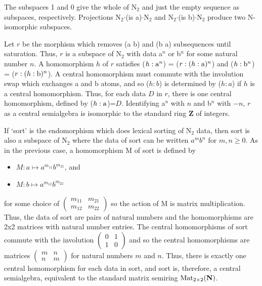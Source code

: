 \documentclass[11pt]{article}
\begin{document}
\begin{itemize}
\item{The subspaces 1 and 0 give the whole of N$_2$ and just the empty sequence as subspaces, respectively.  
Projections N$_2$$\cdot$(is a)$\cdot$N$_2$ and N$_2$$\cdot$(is b)$\cdot$N$_2$ produce two N-isomorphic subspaces.}

\item{Let $r$ be the morphism which removes (a b) and (b a) subsequences until saturation.  Thus, $r$ is a subspace of N$_2$ with 
data a$^n$ or b$^n$ for some natural number $n$.  A homomorphism $h$ of $r$ satisfies ($h:{\rm a}^n$) = ($r:(h:{\rm a})^n$) and 
($h:{\rm b}^n$) = ($r:(h:{\rm b})^n$).  A central homomorphism must commute with the involution swap which exchanges a and b atoms, 
and so ($h:b$) is determined by ($h:a$) if $h$ is a central homomorphism.  Thus, for each data $D$ in $r$, there is one central homomorphism, 
defined by ($h:{\rm a}$)=$D$.  Identifying a$^n$ with $n$ and b$^n$ with $-n$, $r$ as a central semialgebra is isomorphic to the 
standard ring $\mathbf Z$ of integers. 

\item{If `sort' is the endomorphism which does lexical sorting of N$_2$ data, then sort is also a subspace of N$_2$ where the 
data of sort can be written $a^m b^n$ for $m,n\ge 0$.  As in the previous case, a homomorphism M of sort is defined by  
\begin{itemize}
\item [] $M: a\mapsto a^{m_{11}} b^{m_{21}}$, and 
\item [] $M: b\mapsto a^{m_{12}} b^{m_{22}}$ 
\end{itemize}
for some choice of 
$
\left (
\begin{array}{cc} 
m_{11} & m_{21} \\ m_{12} & m_{22}  
\end{array}
\right ) 
$
so the action of M is matrix multiplication.  Thus, the data of sort are pairs of natural numbers and the 
homomorphisms are 2x2 matrices with natural number entries.  The central homomorphisms of sort 
commute with the involution 
$
\left (
\begin{array}{cc} 
0 & 1 \\ 1 & 0 
\end{array}
\right ) 
$
and so the central homomorphisms are matrices 
$
\left (
\begin{array}{cc} 
m & n \\ n & m 
\end{array}
\right ) 
$
for natural numbers $m$ and $n$.  Thus, there is exactly one central homomorphism for each data in sort, 
and sort is, therefore, a central semialgebra, equivalent to the standard matrix semiring ${\rm Mat}_{2\times2}(\mathbf N)$.
}

}
\end{itemize}
\end{document}
